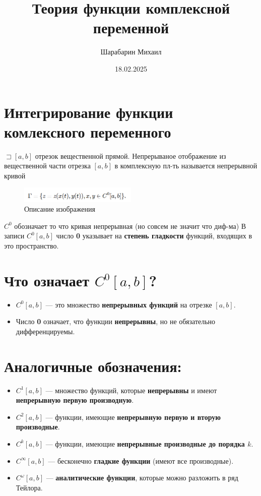 \documentclass{article}
\title{Теория функции комплексной переменной}
\author{Шарабарин Михаил}
\date{18.02.2025}
\begin{document}
\section{Интегрирование функции комлексного переменного}
$ \sqsupset \left[a,b\right]  $ отрезок вещественной прямой. Непрерываное 
отображение из вещественной части  отрезка $\left[a,b\right]$ в комплексную пл-ть
называется непрерывной кривой 

\begin{figure}[h]
    \centering
    \includegraphics[width=0.5\textwidth]{2025-02-18-14-46-39.png}
    \caption{Описание изображения}
    \label{fig:example}
\end{figure}

\(C^0\) обозначает то что кривая непрерывная (но совсем не значит что диф-ма)
В записи \( C^0[a, b] \) число \textbf{0} указывает на \textbf{степень гладкости} функций, входящих в это пространство.

\section*{Что означает \( C^0[a, b] \)?}
\begin{itemize}
    \item \( C^0[a, b] \) — это множество \textbf{непрерывных функций} на отрезке \( [a, b] \).
    \item Число \textbf{0} означает, что функции \textbf{непрерывны}, но не обязательно дифференцируемы.
\end{itemize}

\section*{Аналогичные обозначения:}
\begin{itemize}
    \item \( C^1[a, b] \) — множество функций, которые \textbf{непрерывны} и имеют \textbf{непрерывную первую производную}.
    \item \( C^2[a, b] \) — функции, имеющие \textbf{непрерывную первую и вторую производные}.
    \item \( C^k[a, b] \) — функции, имеющие \textbf{непрерывные производные до порядка \( k \)}.
    \item \( C^\infty[a, b] \) — бесконечно \textbf{гладкие функции} (имеют все производные).
    \item \( C^\omega[a, b] \) — \textbf{аналитические функции}, которые можно разложить в ряд Тейлора.
\end{itemize}
\end{document}
